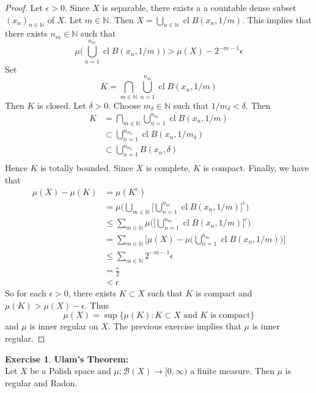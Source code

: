 \documentclass[12pt]{amsart}
\theoremstyle{definition}
\newtheorem{ex}[definition]{Exercise}
\newcommand{\del}{\delta}
\newcommand{\ep}{\epsilon}
\newcommand{\N}{\mathbb{N}}
\newcommand{\MB}{\mathcal{B}}
\DeclareMathOperator{\cl}{cl}
\begin{document}
	\begin{proof}
		Let $\ep >0$. Since $X$ is separable, there exists a a countable dense subset $(x_{n})_{n \in \N}$ of $X$. Let $m \in \N$. Then $X = \bigcup\limits_{n \in \N} \cl B(x_n, 1/m)$. This implies that there exists $n_m \in \N$ such that 
		$$\mu \bigg(\bigcup\limits_{n = 1}^{n_m} \cl B(x_n, 1/m) \bigg) > \mu(X) - 2^{-m-1}\ep$$ 
		Set 
		$$K = \bigcap\limits_{m \in \N} \bigcup\limits_{n = 1}^{n_m} \cl B(x_n, 1/m) $$
		Then $K$ is closed. Let $\del >0$. Choose $m_{\del} \in \N$ such that $1/m_{\del} < \del$. Then 
		\begin{align*}
			K 
			&=  \bigcap\limits_{m \in \N} \bigcup\limits_{n = 1}^{n_m} \cl B(x_n, 1/m) \\
			& \subset \bigcup\limits_{n = 1}^{n_{m_{\del}}} \cl B(x_n, 1/{m_{\del}}) \\
			& \subset  \bigcup\limits_{n = 1}^{n_{m_{\del}}} B(x_n, \del) \\ 
		\end{align*}
		Hence $K$ is totally bounded. Since $X$ is complete, $K$ is compact. Finally, we have that 
		\begin{align*}
			\mu(X) - \mu(K)
			&= \mu(K^c) \\
			&= \mu \bigg( \bigcup\limits_{m \in \N} \bigg[ \bigcup\limits_{n = 1}^{n_m} \cl B(x_n, 1/m) \bigg]^c  \bigg) \\
			&\leq \sum_{m \in \N} \mu \bigg( \bigg[ \bigcup\limits_{n = 1}^{n_m} \cl B(x_n, 1/m) \bigg]^c \bigg) \\
			&= \sum_{m \in \N} \bigg[ \mu(X) - \mu \bigg(  \bigcup\limits_{n = 1}^{n_m} \cl B(x_n, 1/m)  \bigg) \bigg] \\
			& \leq \sum_{m \in \N} 2^{-m-1}\ep \\
			&= \frac{\ep}{2} \\
			&< \ep
		\end{align*} 
	So for each $\ep >0$, there exists $K \subset X$ such that $K$ is compact and $\mu(K) > \mu(X) - \ep$. Thus $$\mu(X) = \sup\{\mu(K): \text{$K \subset X$ and $K$ is compact}\}$$ and $\mu$ is inner regular on $X$. The previous exercise implies that $\mu$ is inner regular.   
	\end{proof}
	
	\begin{ex} \textbf{Ulam's Theorem:} \\
		Let $X$ be a Polish space and $\mu: \MB(X) \rightarrow [0, \infty)$ a finite measure. Then $\mu$ is regular and Radon.
	\end{ex}
\end{document}
